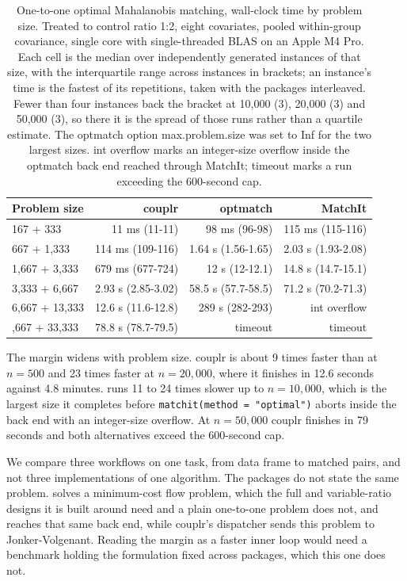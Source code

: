\begin{table}

\caption{\label{tab:scaling}One-to-one optimal Mahalanobis matching, wall-clock time by problem size. Treated to control ratio 1:2, eight covariates, pooled within-group covariance, single core with single-threaded BLAS on an Apple M4 Pro. Each cell is the median over independently generated instances of that size, with the interquartile range across instances in brackets; an instance's time is the fastest of its repetitions, taken with the packages interleaved.  Fewer than four instances back the bracket at 10,000 (3), 20,000 (3) and 50,000 (3), so there it is the spread of those runs rather than a quartile estimate. The optmatch option max.problem.size was set to Inf for the two largest sizes. int overflow marks an integer-size overflow inside the optmatch back end reached through MatchIt; timeout marks a run exceeding the 600-second cap.}
\centering
\begin{tabular}[t]{lrrr}
\toprule
Problem size & couplr & optmatch & MatchIt\\
\midrule
167 + 333 & 11 ms (11-11) & 98 ms (96-98) & 115 ms (115-116)\\
667 + 1,333 & 114 ms (109-116) & 1.64 s (1.56-1.65) & 2.03 s (1.93-2.08)\\
1,667 + 3,333 & 679 ms (677-724) & 12 s (12-12.1) & 14.8 s (14.7-15.1)\\
3,333 + 6,667 & 2.93 s (2.85-3.02) & 58.5 s (57.7-58.5) & 71.2 s (70.2-71.3)\\
6,667 + 13,333 & 12.6 s (11.6-12.8) & 289 s (282-293) & int overflow\\
\addlinespace
16,667 + 33,333 & 78.8 s (78.7-79.5) & timeout & timeout\\
\bottomrule
\end{tabular}
\end{table}

The margin widens with problem size. couplr is about
9 times faster than  at
\(n = 500\) and 23 times faster at
\(n = 20{,}000\), where it finishes in
12.6 seconds against
4.8 minutes.
 runs
11
to
24
times slower up to \(n = 10{,}000\), which is the largest size it completes before
\texttt{matchit(method\ =\ "optimal")} aborts inside the  back end with
an integer-size overflow. At \(n = 50{,}000\) couplr finishes in
79
seconds and both alternatives exceed the 600-second cap.

We compare three workflows on one task, from data frame to matched pairs, and
not three implementations of one algorithm. The packages do not state the same problem.  solves a minimum-cost flow problem,
which the full and variable-ratio designs it is built around need and a plain
one-to-one problem does not, and  reaches that same back end,
while couplr's dispatcher sends this problem to Jonker-Volgenant. Reading the
margin as a faster inner loop would need a benchmark holding the formulation
fixed across packages, which this one does not.

